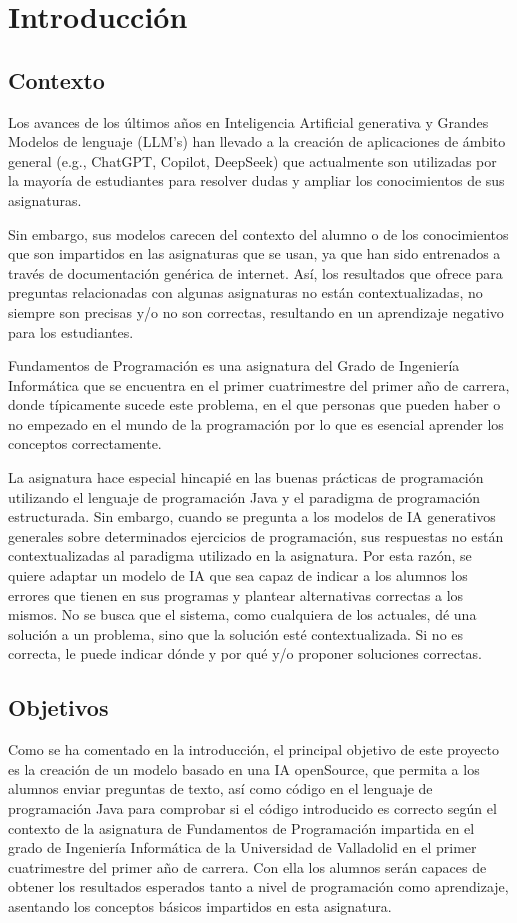 \chapter{Introducción}

\section{Contexto}
Los avances de los últimos años en Inteligencia Artificial generativa y Grandes Modelos de lenguaje (LLM’s) han llevado a la
creación de aplicaciones de ámbito general (e.g., ChatGPT, Copilot, DeepSeek) que actualmente son
utilizadas por la mayoría de estudiantes para resolver dudas y ampliar los conocimientos de sus
asignaturas.

Sin embargo, sus modelos carecen del contexto del alumno o de los conocimientos que son impartidos en las asignaturas que se usan, ya que han sido entrenados a través de documentación genérica de internet. Así, los resultados que ofrece para preguntas relacionadas con algunas asignaturas no están contextualizadas, no siempre son precisas y/o no son correctas, resultando en un aprendizaje negativo para los estudiantes.

Fundamentos de Programación es una asignatura del Grado de Ingeniería Informática que se encuentra en el primer cuatrimestre del primer año de carrera, donde típicamente sucede este problema, en el que personas que pueden haber o no empezado en el mundo de la programación por lo que es esencial aprender los conceptos correctamente.

La asignatura hace especial hincapié en las buenas prácticas de programación utilizando el lenguaje de programación Java y el paradigma de programación estructurada. Sin embargo, cuando se pregunta a los modelos de IA generativos generales sobre determinados ejercicios de programación, sus respuestas no están contextualizadas al paradigma utilizado en la asignatura. Por esta razón, se quiere adaptar un modelo de IA que sea capaz de indicar a los alumnos los errores que tienen en sus programas y plantear alternativas correctas a los mismos. No se busca que el sistema, como cualquiera de los actuales, dé una solución a un problema, sino que la solución esté contextualizada. Si no es correcta, le puede indicar dónde y por qué y/o proponer soluciones correctas.

\section{Objetivos}
\label{sec:Objetivos}
Como se ha comentado en la introducción, el principal objetivo de este proyecto es la creación de un modelo basado en una IA openSource, que permita a los alumnos enviar preguntas de texto, así como código en el lenguaje de programación Java para comprobar si el código introducido es correcto según el contexto de la asignatura de Fundamentos de Programación impartida en el grado de Ingeniería Informática de la Universidad de Valladolid en el primer cuatrimestre del primer año de carrera. Con ella los alumnos serán capaces de obtener los resultados esperados tanto a nivel de programación como aprendizaje, asentando los conceptos básicos impartidos en esta asignatura.


